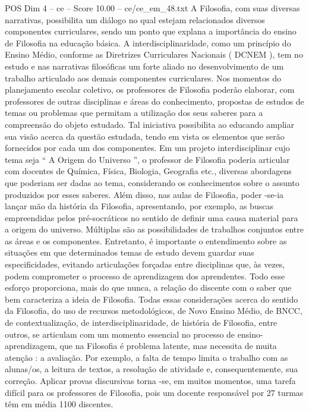 \begin{textsample}{POS Dim 4 – ce – Score 10.00 – ce/ce\_em\_48.txt}
A Filosofia, com suas diversas narrativas, possibilita um diálogo no qual estejam relacionados diversos componentes curriculares, sendo um ponto que explana a importância do ensino de Filosofia na educação básica.
A interdisciplinaridade, como um princípio do Ensino Médio, conforme as Diretrizes Curriculares Nacionais ( DCNEM ), tem no estudo e nas narrativas filosóficas um forte aliado no desenvolvimento de um trabalho articulado aos demais componentes curriculares.
Nos momentos do planejamento escolar coletivo, os professores de Filosofia poderão elaborar, com professores de outras disciplinas e áreas do conhecimento, propostas de estudos de temas ou problemas que permitam a utilização dos seus saberes para a compreensão do objeto estudado.
Tal iniciativa possibilita ao educando ampliar sua visão acerca da questão estudada, tendo em vista os elementos que serão fornecidos por cada um dos componentes.
Em um projeto interdisciplinar cujo tema seja “ A Origem do Universo ”, o professor de Filosofia poderia articular com docentes de Química, Física, Biologia, Geografia etc., diversas abordagens que poderiam ser dadas ao tema, considerando os conhecimentos sobre o assunto produzidos por esses saberes.
Além disso, nas aulas de Filosofia, poder -se-ia lançar mão da história da Filosofia, apresentando, por exemplo, as buscas empreendidas pelos pré-socráticos no sentido de definir uma causa material para a origem do universo.
Múltiplas são as possibilidades de trabalhos conjuntos entre as áreas e os componentes.
Entretanto, é importante o entendimento sobre as situações em que determinados temas de estudo devem guardar suas especificidades, evitando articulações forçadas entre disciplinas que, às vezes, podem comprometer o processo de aprendizagem dos aprendentes.
Todo esse esforço proporciona, mais do que nunca, a relação do discente com o saber que bem caracteriza a ideia de Filosofia.
Todas essas considerações acerca do sentido da Filosofia, do uso de recursos metodológicos, de Novo Ensino Médio, de BNCC, de contextualização, de interdisciplinaridade, de história de Filosofia, entre outros, se articulam com um momento essencial no processo de ensino-aprendizagem, que na Filosofia é problema latente, mas necessita de muita atenção : a avaliação.
Por exemplo, a falta de tempo limita o trabalho com as alunas/os, a leitura de textos, a resolução de atividade e, consequentemente, sua correção.
Aplicar provas discursivas torna -se, em muitos momentos, uma tarefa difícil para os professores de Filosofia, pois um docente responsável por 27 turmas têm em média 1100 discentes.

\end{textsample}
